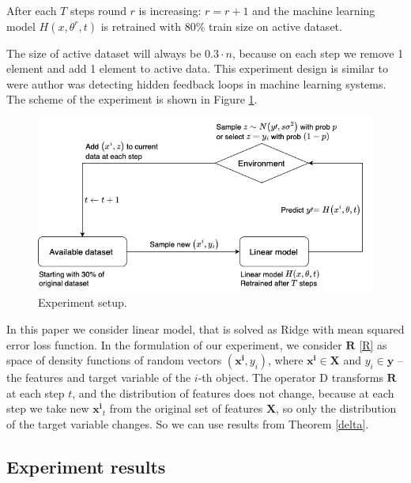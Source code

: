 \documentclass{article}
\begin{document}
        After each $T$ steps round $r$ is increasing: $r = r+1$ and the machine learning model $H(x, \theta^r, t)$ is retrained with $80\%$ train size on active dataset. 

        The size of active dataset will always be $0.3 \cdot n$, because on each step we remove 1 element and add 1 element to active data. This experiment design is similar to \cite{khritankov2021hidden} were author was detecting hidden feedback loops in machine learning systems. The scheme of the experiment is shown in Figure \ref{ex_set}.

        \begin{figure}[h!]
            \centering
            \includegraphics[scale = 0.5]{pictures/Experiment_setup.png}
            \caption{Experiment setup.}
            \label{ex_set}
        \end{figure}

        In this paper we consider linear model, that is solved as Ridge with mean squared error loss function. In the formulation of our experiment, we consider $\mathbf{R}$ \eqref{R} as space of density functions of random vectors $(\mathbf{x^i}, y_i)$, where $\mathbf{x^i} \in \textbf{X}$ and $y_i \in \textbf{y}$ -- the features and target variable of the $i$-th object. The operator $\text{D}$ transforms $\mathbf{R}$ at each step $t$, and the distribution of features does not change, because at each step we take new $\mathbf{x^i}_t$ from the original set of features $\textbf{X}$, so only the distribution of the target variable changes. So we can use results from Theorem \ref{delta}. 

\newpage

    \subsection{Experiment results} \label{res}
\end{document}

